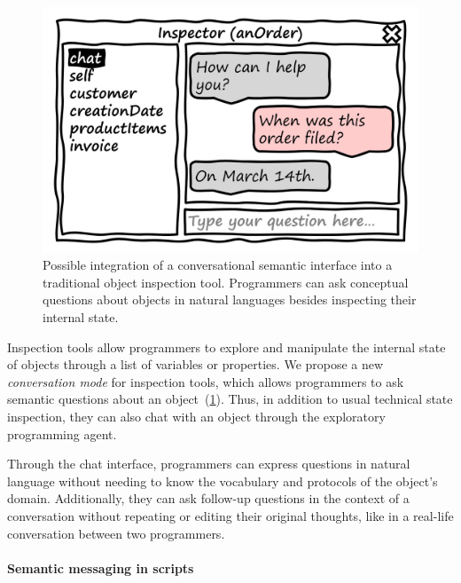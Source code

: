 \begin{figure}
	\centering
	\includegraphics[height=10\baselineskip]{03_agent/inspector.png}
	\caption[Possible integration of a conversational semantic interface into a traditional object inspection tool.]{
		Possible integration of a conversational semantic interface into a traditional object inspection tool.
		Programmers can ask conceptual questions about objects in natural languages besides inspecting their internal state.
	}
	\label{fig:design/agent/interfaces/inspector}
\end{figure}

Inspection tools allow programmers to explore and manipulate the internal state of objects through a list of variables or properties.
We propose a new \emph{conversation mode} for inspection tools, which allows programmers to ask semantic questions about an object~(\cref{fig:design/agent/interfaces/inspector}).
Thus, in addition to usual technical state inspection, they can also chat with an object through the exploratory programming agent.

Through the chat interface, programmers can express questions in natural language without needing to know the vocabulary and protocols of the object's domain.
Additionally, they can ask follow-up questions in the context of a conversation without repeating or editing their original thoughts, like in a real-life conversation between two programmers.

\paragraph{Semantic messaging in scripts}
\label{par:design/agent/interfaces/messaging}

